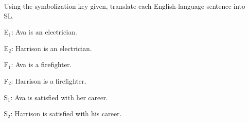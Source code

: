 


\problempart Using the symbolization key given, translate each English-language sentence into SL.
\label{pr.avacareer}
\begin{ekey}
\item[E$_1$:] Ava is an electrician.
\item[E$_2$:] Harrison is an electrician.
\item[F$_1$:] Ava is a firefighter.
\item[F$_2$:] Harrison is a firefighter.
\item[S$_1$:] Ava is satisfied with her career.
\item[S$_2$:] Harrison is satisfied with his career.
\end{ekey}
